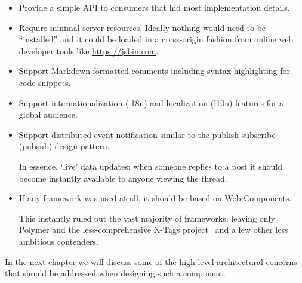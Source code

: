 \begin{itemize}
\item Provide a simple API to consumers that hid most implementation details.

\item Require minimal server resources. Ideally nothing would need to be ``installed'' and it could be loaded in a cross-origin fashion from online web developer tools like \url{https://jsbin.com}.

\item Support Markdown formatted comments including syntax highlighting for code snippets.

\item Support 
internationalization
(i18n) and 
localization (l10n) features for a global audience.

\item Support distributed event notification similar to the 
publish-subscribe (pubsub) design pattern. 

In essence, `live' data updates:
when someone replies to a post it should become instantly available to anyone viewing the thread.

\item If any framework was used at all, it should be based on Web Components. 

This instantly ruled out the vast majority of frameworks, 
leaving only Polymer and the less-comprehensive X-Tags project~\cite{x-tagscontributors2015} and a few other less ambitious contenders.

\end{itemize}

In the next chapter we will discuss some of the high level architectural concerns that should be addressed when designing such a component.
